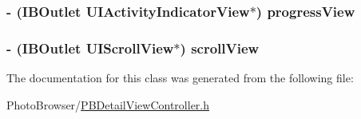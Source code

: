 \label{interface_p_b_detail_view_controller_adee2c301578c99fb57f38994799e641e}
\hypertarget{interface_p_b_detail_view_controller_ad38a6c45298415a486b74cf196bd0f9a}{
\subsubsection[{progressView}]{\setlength{\rightskip}{0pt plus 5cm}-\/ (IBOutlet UIActivityIndicatorView$\ast$) progressView}}
\label{interface_p_b_detail_view_controller_ad38a6c45298415a486b74cf196bd0f9a}
\hypertarget{interface_p_b_detail_view_controller_a74d6f6ed5cc6ccfdcffa8e1db3144010}{
\subsubsection[{scrollView}]{\setlength{\rightskip}{0pt plus 5cm}-\/ (IBOutlet UIScrollView$\ast$) scrollView}}
\label{interface_p_b_detail_view_controller_a74d6f6ed5cc6ccfdcffa8e1db3144010}


The documentation for this class was generated from the following file:\begin{DoxyCompactItemize}
\item 
PhotoBrowser/\hyperlink{_p_b_detail_view_controller_8h}{PBDetailViewController.h}\end{DoxyCompactItemize}
